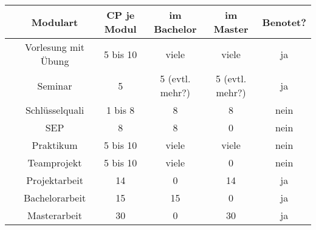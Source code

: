 \begin{tabular}{|p{3mm}|c|c|c|c|c|}
\hline & \textbf{Modulart}		& \textbf{CP je Modul} 	&\textbf{im Bachelor}	 	& \textbf{im Master}		& \textbf{Benotet?} \\ 
\hline & Vorlesung mit Übung	& 5 bis 10 				& viele						& viele						& ja \\ 
\hline & Seminar				& 5 	 				& 5 (evtl. mehr?)			& 5 (evtl. mehr?)			& ja \\ 
\hline & Schlüsselquali			& 1 bis 8 				& 8							& 8							& nein \\ 
\hline & SEP					& 8		 				& 8							& 0							& nein \\ 
\hline & Praktikum				& 5 bis 10 				& viele						& viele						& nein \\ 
\hline & Teamprojekt			& 5 bis 10 				& viele						& 0							& nein \\ 
\hline & Projektarbeit			& 14	 				& 0							& 14						& ja \\ 
\hline & Bachelorarbeit			& 15					& 15						& 0							& ja \\ 
\hline & Masterarbeit			& 30	 				& 0							& 30						& ja \\ 
\hline
\end{tabular} 
